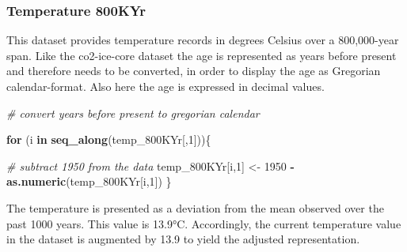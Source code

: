 \documentclass[
]{article}
\newenvironment{Shaded}{\begin{snugshade}}{\end{snugshade}}
\newcommand{\AttributeTok}[1]{\textcolor[rgb]{0.13,0.29,0.53}{#1}}
\newcommand{\CommentTok}[1]{\textcolor[rgb]{0.56,0.35,0.01}{\textit{#1}}}
\newcommand{\ControlFlowTok}[1]{\textcolor[rgb]{0.13,0.29,0.53}{\textbf{#1}}}
\newcommand{\DecValTok}[1]{\textcolor[rgb]{0.00,0.00,0.81}{#1}}
\newcommand{\FunctionTok}[1]{\textcolor[rgb]{0.13,0.29,0.53}{\textbf{#1}}}
\newcommand{\NormalTok}[1]{#1}
\newcommand{\OtherTok}[1]{\textcolor[rgb]{0.56,0.35,0.01}{#1}}
\newcommand{\SpecialCharTok}[1]{\textcolor[rgb]{0.81,0.36,0.00}{\textbf{#1}}}
\begin{document}
\begin{Shaded}
\end{Shaded}

\hypertarget{temperature-800kyr}{%
\subsubsection{Temperature 800KYr}\label{temperature-800kyr}}

This dataset provides temperature records in degrees Celsius over a
800,000-year span. Like the co2-ice-core dataset the age is represented
as years before present and therefore needs to be converted, in order to
display the age as Gregorian calendar-format. Also here the age is
expressed in decimal values.

\begin{Shaded}
\begin{Highlighting}[]
\CommentTok{\# convert years before present to gregorian calendar}

  \ControlFlowTok{for}\NormalTok{ (i }\ControlFlowTok{in} \FunctionTok{seq\_along}\NormalTok{(temp\_800KYr[,}\DecValTok{1}\NormalTok{]))\{}
    
    \CommentTok{\# subtract 1950 from the data}
\NormalTok{    temp\_800KYr[i,}\DecValTok{1}\NormalTok{] }\OtherTok{\textless{}{-}} \DecValTok{1950} \SpecialCharTok{{-}} \FunctionTok{as.numeric}\NormalTok{(temp\_800KYr[i,}\DecValTok{1}\NormalTok{])}
\NormalTok{  \}}
\end{Highlighting}
\end{Shaded}

The temperature is presented as a deviation from the mean observed over
the past 1000 years. This value is 13.9°C. Accordingly, the current
temperature value in the dataset is augmented by 13.9 to yield the
adjusted representation.
\end{document}
